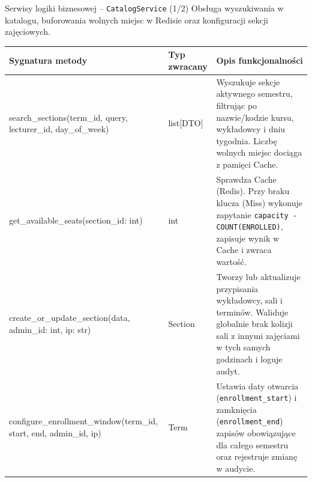 \documentclass[aspectratio=169, 10pt, xcolor=table]{beamer}
\renewcommand{\arraystretch}{1.18}
\begin{document}
\begin{frame}{Serwisy logiki biznesowej -- \texttt{CatalogService} (1/2)}
    \scriptsize
    \renewcommand{\arraystretch}{1.15}
    Obsługa wyszukiwania w katalogu, buforowania wolnych miejsc w Redisie oraz konfiguracji sekcji zajęciowych.
    \vspace{3pt}

    \begin{tabularx}{\textwidth}{@{} M{0.36\textwidth} T{0.14\textwidth} Y @{}}
        \toprule
        \textbf{\textsf{\textcolor{NavyPrimary}{Sygnatura metody}}} & \textbf{\textsf{\textcolor{NavyPrimary}{Typ zwracany}}} & \textbf{\textcolor{NavyPrimary}{Opis funkcjonalności}} \\
        \midrule
        search\_sections(term\_id, query, lecturer\_id, day\_of\_week) & list[DTO] & Wyszukuje sekcje aktywnego semestru, filtrując po nazwie/kodzie kursu, wykładowcy i dniu tygodnia. Liczbę wolnych miejsc dociąga z pamięci Cache. \\
        get\_available\_seats(section\_id: int) & int & Sprawdza Cache (Redis). Przy braku klucza (Miss) wykonuje zapytanie \texttt{capacity - COUNT(ENROLLED)}, zapisuje wynik w Cache i zwraca wartość. \\
        create\_or\_update\_section(data, admin\_id: int, ip: str) & Section & Tworzy lub aktualizuje przypisania wykładowcy, sali i terminów. Waliduje globalnie brak kolizji sali z innymi zajęciami w tych samych godzinach i loguje audyt. \\
        configure\_enrollment\_window(\newline term\_id, start, end, admin\_id, ip) & Term & Ustawia daty otwarcia (\texttt{enrollment\_start}) i zamknięcia (\texttt{enrollment\_end}) zapisów obowiązujące dla całego semestru oraz rejestruje zmianę w audycie. \\
        \bottomrule
    \end{tabularx}
\end{frame}
\end{document}
